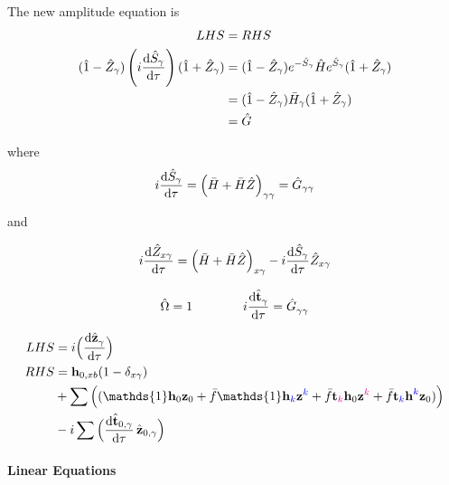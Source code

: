 \documentclass{article}
\newcommand{\bh}{\textbf{h}}
\newcommand{\bt}{\textbf{t}}
\newcommand{\bz}{\textbf{z}}
\begin{document}
The new amplitude equation is
\begin{align}
    LHS &= RHS
\\
    (\hat{1} - \hat{Z}_{\gamma})\left(i\dv{\hat{S}_{\gamma}}{\tau}\right)(\hat{1} + \hat{Z}_{\gamma})
    &= (\hat{1} - \hat{Z}_{\gamma})e^{-\hat{S}_{\gamma}}\hat{H}e^{\hat{S}_{\gamma}}(\hat{1} + \hat{Z}_{\gamma})
%
\\  &= (\hat{1} - \hat{Z}_{\gamma})\bar{H}_{\gamma}(\hat{1} + \hat{Z}_{\gamma})
\\  &= \hat{G}
\end{align}

where
\begin{align}
    i\dv{\hat{S}_{\gamma}}{\tau} = \left(\bar{H} + \bar{H}\hat{Z}\right)_{\gamma\gamma} = \hat{G}_{\gamma\gamma}
\end{align}

and

\begin{align}
    i\dv{\hat{Z}_{x\gamma}}{\tau} = \left(\bar{H} + \bar{H}\hat{Z}\right)_{x\gamma} - i\dv{\hat{S}_{\gamma}}{\tau}\hat{Z}_{x\gamma}
\end{align}

\clearpage
%
%
%
%
%
%


\vspace{2cm}%
%
%
%
%

\begin{equation}
    \hat{\Omega} = 1
\qquad\qquad
    i\dv{\hat{\bt}^{}_{\gamma}}{\tau} = \hat{G}^{}_{\gamma\gamma}
\end{equation}

%
%
%
%
%

\begin{align}\begin{split}
LHS &=
    i\Big(\dv{\hat{\bz}^{}_{\gamma}}{\tau}\Big)
\\ RHS &=
%
%
\bh_{0,xb}(1-\delta_{x\gamma})\\&+\sum\Big((\mathds{1}\bh_0\bz_0 + \bar{f}\mathds{1}\bh_{\blue{k}\red{}}\bz^{\blue{k}\red{}} + \bar{f}\bt_{\magenta{}\blue{}\magenta{k}\red{}}\bh_0\bz^{\magenta{k}\red{}} + \bar{f}\bt_{\magenta{}\blue{k}\magenta{}\red{}}\bh^{\blue{k}\blue{}\red{}}\bz_0)\Big)\\&-i\sum\Big(\dv{\hat{\bt}_{0, \gamma}}{\tau}\,\hat{\bz}_{0, \gamma}\Big)
\end{split}\end{align}

\paragraph{Linear Equations}
\end{document}
